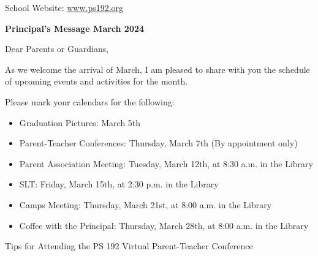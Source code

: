 \documentclass[12pt,letterpaper]{article}
\begin{document}
\vspace*{0.5in}
School Website: \href{https://www.ps192.org}{www.ps192.org}

\textbf{Principal's Message March 2024}

Dear Parents or Guardians,

As we welcome the arrival of March, I am pleased to share with you the schedule of upcoming events and activities for the month.

Please mark your calendars for the following:
\begin{itemize}
\item Graduation Pictures: March 5th
\item Parent-Teacher Conferences: Thursday, March 7th (By appointment only)
\item Parent Association Meeting: Tuesday, March 12th, at 8:30 a.m. in the Library
\item SLT: Friday, March 15th, at 2:30 p.m. in the Library
\item Camps Meeting: Thursday, March 21st, at 8:00 a.m. in the Library
\item Coffee with the Principal: Thursday, March 28th, at 8:00 a.m. in the Library 
\end{itemize}
Tips for Attending the PS 192 Virtual Parent-Teacher Conference
\end{document}
